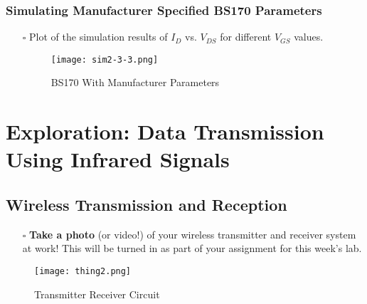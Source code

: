 \documentclass[12pt]{article}
\begin{document}
\subsubsection{Simulating Manufacturer Specified BS170 Parameters}

\begin{itemize}    
    \item[$\square$] Plot of the simulation results of $I_D$ vs. $V_{DS}$ for different $V_{GS}$ values.

    \begin{figure}[h]
        \centering
        \texttt{[image: sim2-3-3.png]}
        \caption{BS170 With Manufacturer Parameters}
        \label{fig:Manufacturer}
    \end{figure}
\end{itemize}

\section{Exploration: Data Transmission Using Infrared Signals}

\setcounter{subsection}{1}
\subsection{Wireless Transmission and Reception}
\begin{enumerate}
\item[$\square$] \textbf{Take a photo} (or video!) of your wireless transmitter and receiver system at work! This will be turned in as part of your assignment for this week's lab.
\end{enumerate}

\begin{figure}[h]
    \centering
    \texttt{[image: thing2.png]}
    \caption{Transmitter Receiver Circuit}
    \label{fig:TxRx}
\end{figure}
\end{document}
